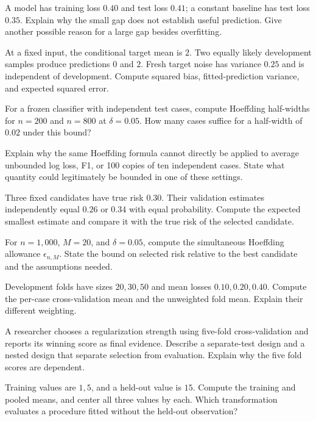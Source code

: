 \begin{exercises}
\item {}A model has training loss $0.40$ and test loss $0.41$; a constant baseline has test loss $0.35$. Explain why the small gap does not establish useful prediction. Give another possible reason for a large gap besides overfitting.
\item {}At a fixed input, the conditional target mean is $2$. Two equally likely development samples produce predictions $0$ and $2$. Fresh target noise has variance $0.25$ and is independent of development. Compute squared bias, fitted-prediction variance, and expected squared error.
\item {}For a frozen classifier with independent test cases, compute Hoeffding half-widths for $n=200$ and $n=800$ at $\delta=0.05$. How many cases suffice for a half-width of $0.02$ under this bound?
\item {}Explain why the same Hoeffding formula cannot directly be applied to average unbounded log loss, F1, or 100 copies of ten independent cases. State what quantity could legitimately be bounded in one of these settings.
\item {}Three fixed candidates have true risk $0.30$. Their validation estimates independently equal $0.26$ or $0.34$ with equal probability. Compute the expected smallest estimate and compare it with the true risk of the selected candidate.
\item {}For $n=1{,}000$, $M=20$, and $\delta=0.05$, compute the simultaneous Hoeffding allowance $\epsilon_{n,M}$. State the bound on selected risk relative to the best candidate and the assumptions needed.
\item {}Development folds have sizes $20,30,50$ and mean losses $0.10,0.20,0.40$. Compute the per-case cross-validation mean and the unweighted fold mean. Explain their different weighting.
\item {}A researcher chooses a regularization strength using five-fold cross-validation and reports its winning score as final evidence. Describe a separate-test design and a nested design that separate selection from evaluation. Explain why the five fold scores are dependent.
\item {}Training values are $1,5$, and a held-out value is $15$. Compute the training and pooled means, and center all three values by each. Which transformation evaluates a procedure fitted without the held-out observation?

\end{exercises}
